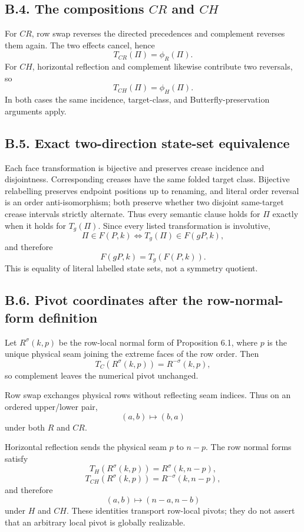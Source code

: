 \documentclass[11pt]{article}
\theoremstyle{definition}
\theoremstyle{remark}
\begin{document}
\subsection{\texorpdfstring{B.4. The compositions \(CR\) and
\(CH\)}{B.4. The compositions CR and CH}}\label{b.4.-the-compositions-cr-and-ch}

For \(CR\), row swap reverses the directed precedences and complement
reverses them again. The two effects cancel, hence \[
T_{CR}(\Pi)=\phi_R(\Pi).
\] For \(CH\), horizontal reflection and complement likewise contribute
two reversals, so \[
T_{CH}(\Pi)=\phi_H(\Pi).
\] In both cases the same incidence, target-class, and
Butterfly-preservation arguments apply.

\subsection{B.5. Exact two-direction state-set
equivalence}\label{b.5.-exact-two-direction-state-set-equivalence}

Each face transformation is bijective and preserves crease incidence and
disjointness. Corresponding creases have the same folded target class.
Bijective relabelling preserves endpoint positions up to renaming, and
literal order reversal is an order anti-isomorphism; both preserve
whether two disjoint same-target crease intervals strictly alternate.
Thus every semantic clause holds for \(\Pi\) exactly when it holds for
\(T_g(\Pi)\). Since every listed transformation is involutive, \[
\Pi\in F(P,k)\iff T_g(\Pi)\in F(gP,k),
\] and therefore \[
F(gP,k)=T_g(F(P,k)).
\] This is equality of literal labelled state sets, not a symmetry
quotient.

\subsection{B.6. Pivot coordinates after the row-normal-form
definition}\label{b.6.-pivot-coordinates-after-the-row-normal-form-definition}

Let \(R^\sigma(k,p)\) be the row-local normal form of Proposition 6.1,
where \(p\) is the unique physical seam joining the extreme faces of the
row order. Then \[
T_C(R^\sigma(k,p))=R^{-\sigma}(k,p),
\] so complement leaves the numerical pivot unchanged.

Row swap exchanges physical rows without reflecting seam indices. Thus
on an ordered upper/lower pair, \[
(a,b)\longmapsto(b,a)
\] under both \(R\) and \(CR\).

Horizontal reflection sends the physical seam \(p\) to \(n-p\). The row
normal forms satisfy \[
T_H(R^\sigma(k,p))=R^\sigma(k,n-p),
\] \[
T_{CH}(R^\sigma(k,p))=R^{-\sigma}(k,n-p),
\] and therefore \[
(a,b)\longmapsto(n-a,n-b)
\] under \(H\) and \(CH\). These identities transport row-local pivots;
they do not assert that an arbitrary local pivot is globally realizable.
\end{document}
